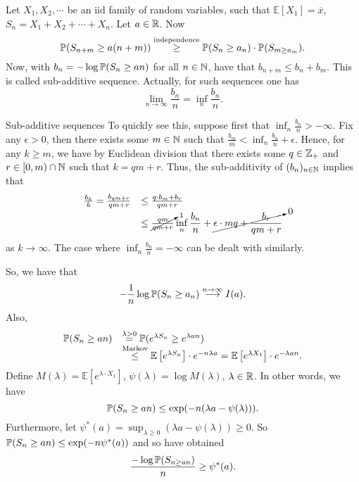 \documentclass{article}
\begin{document}
Let $ X_{1}, X_{2}, \cdots$ be an iid family of random variables, such that $ \mathbb{E}\left[  X_{1}\right] = \overline{x}$, $S_{n} = X_{1}+X_{2}+\cdots+X_{n}$. Let $ a\in \mathbb{R}$. Now 
\[
	\mathbb{P}(S_{n+m}\geq a(n+m))\stackrel{\text{independence}}{\geq}\mathbb{P}(S_{n}\geq a_{n})\cdot \mathbb{P}(S_{m\geq a_{m}}). 
\]
Now, with $ b_{n} = -\log \mathbb{P}(S_{n}\geq an)$ for all $ n\in \mathbb{N}$, have that $ b_{n+m}\leq b_{n}+b_{m}$. This is called  sub-additive sequence. Actually, for such sequences one has 
\[
\lim_{n \to \infty} \frac{b_{n}}{n} = \displaystyle\inf_{n}\frac{b_{n}}{n}.
\]
\begin{examplesblock}{Sub-additive sequences}\label{aside: subbadtive sequences}
To quickly see this, suppose first that $ \displaystyle\inf_{n}\frac{b_{n}}{n}>-\infty$. Fix any $ \epsilon>0$, then there exists some $ m\in \mathbb{N}$ such that $ \frac{b_{m}}{m}< \displaystyle\inf_{n}\frac{b_{n}}{n}+\epsilon$. Hence, for any $ k \geq m$, we have by Euclidean division that there exists some $ q\in \mathbb{Z}_{+}$ and $ r\in [0,m)\cap \mathbb{N}$ such that $ k = qm + r$. Thus, the sub-additivity of $ (b_{n})_{n\in \mathbb{N}}$ implies that 
\[
\begin{array}{ll}
	\frac{b_{k}}{k} = \frac{b_{qm+r}}{qm+r}&\leq \frac{q \cdot b_{m} + b_{r}}{qm+r} \\
					       &\leq \cancelto{1}{\frac{qm}{qm+r}}\displaystyle\inf_{n}\frac{b_{n}}{n} + \cancelto{0}{\epsilon\cdot mq + \frac{b_{r}}{qm+r}}
\end{array}
\]
as $ k\to \infty$. The case where  $ \displaystyle\inf_{n}\frac{b_{n}}{n}=-\infty$ can be dealt with similarly.

\end{examplesblock}

So, we have that 
\[
-\frac{1}{n}\log\mathbb{P}(S_{n}\geq a_{n}) \stackrel{n\to \infty}{\longrightarrow} I(a).
\]
Also, 
\[
\begin{array}{ll}
	\mathbb{P}(S_{n}\geq an) &\stackrel{\lambda >0}{=} \mathbb{P}(e^{\lambda S_{n}}\geq e^{\lambda an}) \\
			  &\stackrel{\text{Markov}}{\leq} \mathbb{E}\left[ e^{\lambda S_{n}} \right]\cdot e^{-n\lambda a} = \mathbb{E}\left[ e^{\lambda X_{1}} \right]\cdot e^{-\lambda an}.
\end{array}
\]
Define $ M(\lambda) = \mathbb{E}\left[ e^{\lambda \cdot X_{1}} \right]$, $ \psi(\lambda) = \log M(\lambda)$, $ \lambda \in \mathbb{R}$. In other words, we have 
\[
\mathbb{P}(S_{n}\geq an)\leq \exp(-n(\lambda a-\psi(\lambda))).
\]
Furthermore, let $ \psi^{*}(a) = \displaystyle\sup_{ \lambda\geq 0}(\lambda a-\psi(\lambda))\geq 0$. So $ \mathbb{P}(S_{n}\geq an)\leq \exp(-n\psi^{*}(a))$ and so have obtained 
\[
 \frac{-\log \mathbb{P}(S_{n\geq an})}{n} \geq \psi^{*}(a).
\]
\end{document}
